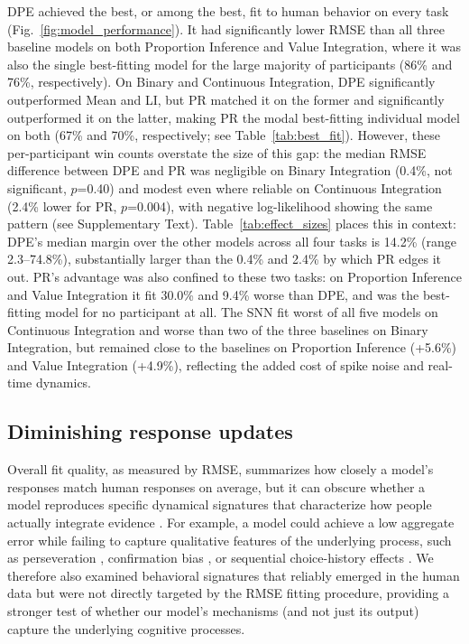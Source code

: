 \documentclass[12pt]{article}
\begin{document}
DPE achieved the best, or among the best, fit to human behavior on every task (Fig.~\ref{fig:model_performance}). It had significantly lower RMSE than all three baseline models on both Proportion Inference and Value Integration, where it was also the single best-fitting model for the large majority of participants (86\% and 76\%, respectively). On Binary and Continuous Integration, DPE significantly outperformed Mean and LI, but PR matched it on the former and significantly outperformed it on the latter, making PR the modal best-fitting individual model on both (67\% and 70\%, respectively; see Table~\ref{tab:best_fit}). However, these per-participant win counts overstate the size of this gap: the median RMSE difference between DPE and PR was negligible on Binary Integration (0.4\%, not significant, $p$=0.40) and modest even where reliable on Continuous Integration (2.4\% lower for PR, $p$=0.004), with negative log-likelihood showing the same pattern (see Supplementary Text). Table~\ref{tab:effect_sizes} places this in context: DPE's median margin over the other models across all four tasks is 14.2\% (range 2.3--74.8\%), substantially larger than the 0.4\% and 2.4\% by which PR edges it out. PR's advantage was also confined to these two tasks: on Proportion Inference and Value Integration it fit 30.0\% and 9.4\% worse than DPE, and was the best-fitting model for no participant at all. The SNN fit worst of all five models on Continuous Integration and worse than two of the three baselines on Binary Integration, but remained close to the baselines on Proportion Inference (+5.6\%) and Value Integration (+4.9\%), reflecting the added cost of spike noise and real-time dynamics.

\subsection{Diminishing response updates}
Overall fit quality, as measured by RMSE, summarizes how closely a model's responses match human responses on average, but it can obscure whether a model reproduces specific dynamical signatures that characterize how people actually integrate evidence \cite{palminteri2017falsification, wilson2019ten}. For example, a model could achieve a low aggregate error while failing to capture qualitative features of the underlying process, such as perseveration \cite{katahira2018statistical}, confirmation bias \cite{palminteri2017confirmation, palminteri2022computational}, or sequential choice-history effects \cite{yu2008sequential, zhang2014sequential}. We therefore also examined behavioral signatures that reliably emerged in the human data but were not directly targeted by the RMSE fitting procedure, providing a stronger test of whether our model's mechanisms (and not just its output) capture the underlying cognitive processes.
\end{document}
